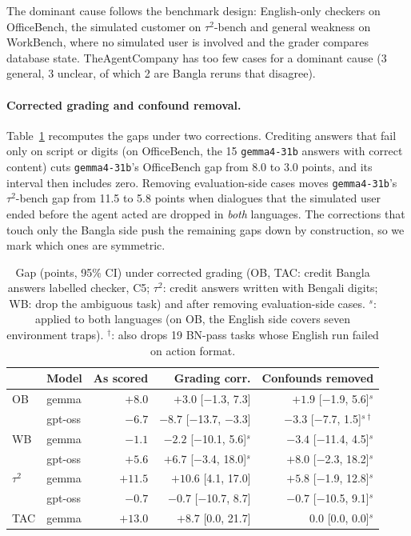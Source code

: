 \documentclass[11pt]{article}
\newcommand{\gemma}{\texttt{gemma4-31b}}
\newcommand{\OB}{OfficeBench}
\newcommand{\WB}{WorkBench}
\newcommand{\TAU}{$\tau^2$-bench}
\newcommand{\TAC}{TheAgentCompany}
\begin{document}
The dominant cause follows the benchmark design: English-only checkers on \OB{}, the simulated
customer on \TAU{} and general weakness on \WB{}, where no simulated user is involved and the
grader compares database state. \TAC{} has too few cases for a dominant cause (3 general, 3
unclear, of which 2 are Bangla reruns that disagree).

\paragraph{Corrected grading and confound removal.} Table~\ref{tab:corrected} recomputes the gaps
under two corrections. Crediting answers that fail only on script or digits (on \OB{}, the 15
\gemma{} answers with correct content) cuts \gemma{}'s \OB{} gap from 8.0 to 3.0 points, and its
interval then includes zero. Removing evaluation-side cases moves \gemma{}'s \TAU{} gap from 11.5
to 5.8 points when dialogues that the simulated user ended before the agent acted are dropped in
\emph{both} languages. The corrections that touch only the Bangla side push the remaining gaps
down by construction, so we mark which ones are symmetric.

\begin{table}[t]
\centering\small
\setlength{\tabcolsep}{8pt}
\begin{tabular}{llrrr}
\toprule
 & Model & As scored & Grading corr. & Confounds removed \\
\midrule
OB & gemma   & $+8.0$  & $+3.0$ [$-$1.3, 7.3]  & $+1.9$ [$-$1.9, 5.6]$^{s}$ \\
   & gpt-oss & $-6.7$  & $-8.7$ [$-$13.7, $-$3.3] & $-3.3$ [$-$7.7, 1.5]$^{s\dagger}$ \\
WB & gemma   & $-1.1$  & $-2.2$ [$-$10.1, 5.6]$^{s}$ & $-3.4$ [$-$11.4, 4.5]$^{s}$ \\
   & gpt-oss & $+5.6$  & $+6.7$ [$-$3.4, 18.0]$^{s}$ & $+8.0$ [$-$2.3, 18.2]$^{s}$ \\
$\tau^2$ & gemma & $+11.5$ & $+10.6$ [4.1, 17.0] & $+5.8$ [$-$1.9, 12.8]$^{s}$ \\
   & gpt-oss & $-0.7$  & $-0.7$ [$-$10.7, 8.7] & $-0.7$ [$-$10.5, 9.1]$^{s}$ \\
TAC & gemma  & $+13.0$ & $+8.7$ [0.0, 21.7]    & $0.0$ [0.0, 0.0]$^{s}$ \\
\bottomrule
\end{tabular}
\caption{Gap (points, 95\% CI) under corrected grading (OB, TAC: credit Bangla answers labelled
checker, C5; $\tau^2$: credit answers written with Bengali digits; WB: drop the ambiguous task) and after
removing evaluation-side cases. $^{s}$: applied to both languages (on OB, the English side covers
seven environment traps). $^{\dagger}$: also drops 19 BN-pass tasks whose English run failed on
action format.}
\label{tab:corrected}
\end{table}
\end{document}
